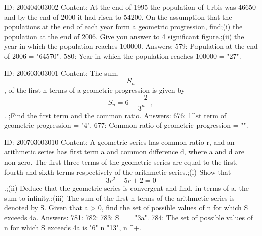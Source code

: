 \documentclass{article}
\begin{document}
ID: 200404003002
Content:
At the end of 1995 the population of Urbis was 46650 and by the end of 2000 it had risen to 54200. On the assumption that the populations at the end of each year form a geometric progression, find;(i) the population at the end of 2006. Give you answer to 4 significant figure.;(ii) the year in which the population reaches 100000. Answers:
579: Population at the end of 2006 = "64570".
580: Year in which the population reaches 100000 = "27".

ID: 200603003001
Content:
The sum, $$S_{n}$$ , of the first n terms of a geometric progression is given by $$S_{n}=6- \frac{2}{3^{n-1}} $$. ;Find the first term and the common ratio. Answers:
676: 1^{st}  term of geometric progression = "4".
677: Common ratio of geometric progression = "".

ID: 200703003010
Content:
A geometric series has common ratio r, and an arithmetic series has first term a and common difference d, where a and d are non-zero. The first three terms of the geometric series are equal to the first, fourth and sixth terms respectively of the arithmetic series.;(i) Show that $$ 3r^{2}-5r+2=0$$.;(ii) Deduce that the geometric series is convergent and find, in terms of a, the sum to infinity.;(iii) The sum of the first n terms of the arithmetic series is denoted by S. Given that a > 0, find the set of possible values of n for which S exceeds 4a. Answers:
781: 
782: 
783:  S_{\infty} = "3a".
784: The set of possible values of n for which S exceeds 4a is "6" \leq n \leq "13", n \in {}^{+}.
\end{document}
